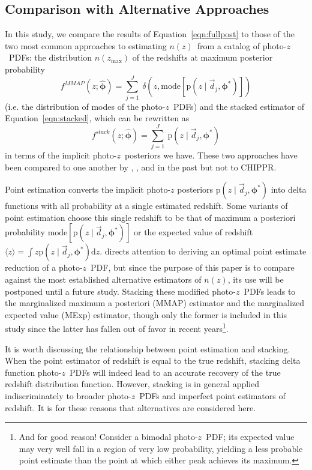 \documentclass[iop]{emulateapj}
\newcommand{\Eq}[1]{Equation~\ref{#1}}
\newcommand{\project}[1]{\textsc{#1}}
\newcommand{\Chippr}{\project{CHIPPR}}%
\newcommand{\data}{\ensuremath{\vec{d}}}%
\newcommand{\pr}[1]{\ensuremath{\mathrm{p}(#1)}}%
\newcommand{\gvn}{\mid}%
\newcommand{\integral}[2]{\ensuremath{\int #1 \mathrm{d} #2}}
\newcommand{\pz}{photo-$z$}
\newcommand{\pzpdf}{\pz\ PDF}%
\newcommand{\nz}{$n(z)$}
\newcommand{\bvec}[1]{\ensuremath{\boldsymbol{#1}}}%
\newcommand{\ndphi}{\bvec{\phi}}
\begin{document}
\subsection{Comparison with Alternative Approaches}
\label{sec:sheldon}

In this study, we compare the results of \Eq{eqn:fullpost} to those of the two most common approaches to estimating \nz\ from a catalog of \pzpdf s: the distribution $n(z_{\mathrm{max}})$ of the redshifts at maximum posterior probability
\begin{equation}
\label{eqn:mmap}
f^{MMAP}(z; \hat{\ndphi}) = \sum_{j=1}^{J}\ \delta(z, \mathrm{mode}[\pr{z \gvn \data_{j}, \ndphi^{*}}])
\end{equation}
(i.e. the distribution of modes of the \pzpdf s) and the stacked estimator of \Eq{eqn:stacked}, which can be rewritten as 
\begin{equation}
\label{eqn:stacked}
f^{stack}(z; \hat{\ndphi}) = \sum_{j=1}^{J}\ \pr{z \gvn \data_{j}, \ndphi^{*}}
\end{equation}
in terms of the implicit \pz\ posteriors we have.
These two approaches have been compared to one another by \citet{hildebrandt_cfhtlens:_2012}, \citet{benjamin_cfhtlens_2013}, and \citet{asorey_galaxy_2016} in the past but not to \Chippr.

Point estimation converts the implicit photo-$z$ posteriors $\pr{z \gvn \data_{j}, \ndphi^{*}}$ into delta functions with all probability at a single estimated redshift.  
Some variants of point estimation choose this single redshift to be that of maximum a posteriori probability $\mathrm{mode}[\pr{z \gvn \data_{j}, \ndphi^{*}}]$ or the expected value of redshift $\langle z \rangle = \integral{z \pr{z \gvn \data_{j}, \ndphi^{*}}}{z}$.
\citet{tanaka_photometric_2018} directs attention to deriving an optimal point estimate reduction of a \pzpdf, but since the purpose of this paper is to compare against the most established alternative estimators of \nz, its use will be postponed until a future study.
Stacking these modified \pzpdf s leads to the marginalized maximum a posteriori (MMAP) estimator and the marginalized expected value (MExp) estimator, though only the former is included in this study since the latter has fallen out of favor in recent years\footnote{And for good reason!  Consider a bimodal \pzpdf; its expected value may very well fall in a region of very low probability, yielding a less probable point estimate than the point at which either peak achieves its maximum.}.

It is worth discussing the relationship between point estimation and stacking.  
When the point estimator of redshift is equal to the true redshift, stacking delta function \pzpdf s will indeed lead to an accurate recovery of the true redshift distribution function.  
However, stacking is in general applied indiscriminately to broader \pzpdf s and imperfect point estimators of redshift.  
It is for these reasons that alternatives are considered here.
\end{document}
